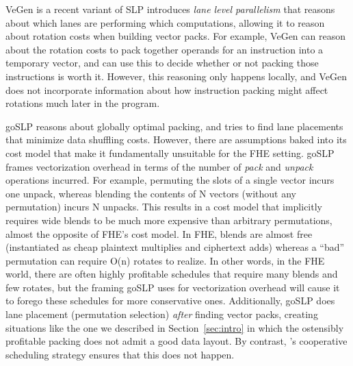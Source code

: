 VeGen \cite{VeGen} is a recent variant of SLP introduces {\em lane level parallelism} that reasons about which lanes are performing which computations, allowing it to reason about rotation costs when building vector packs.
For example, VeGen can reason about the rotation costs to pack together operands for an instruction into a temporary vector, and can use this to decide whether or not packing those instructions is worth it.
However, this reasoning only happens locally, and VeGen does not incorporate information about how instruction packing might affect rotations much later in the program.

goSLP \cite{goSLP} reasons about globally optimal packing, and tries to find lane placements that minimize data shuffling costs. 
However, there are assumptions baked into its cost model that make it fundamentally unsuitable for the FHE setting.
goSLP frames vectorization overhead in terms of the number of {\em pack} and {\em unpack} operations incurred.
For example, permuting the slots of a single vector incurs one unpack, whereas blending the contents of N vectors (without any permutation) incurs N unpacks.
This results in a cost model that implicitly requires wide blends to be much more expensive than arbitrary permutations, almost the opposite of FHE's cost model. In FHE, blends are almost free (instantiated as cheap plaintext multiplies and ciphertext adds) whereas a ``bad'' permutation can require O(n) rotates to realize.
In other words, in the FHE world, there are often highly profitable schedules that require many blends and few rotates, but the framing goSLP uses for vectorization overhead will cause it to forego these schedules for more conservative ones.
Additionally, goSLP does lane placement (permutation selection) {\em after} finding vector packs, creating situations like the one we described in Section~\ref{sec:intro} in which the ostensibly profitable packing does not admit a good data layout.
By contrast, \system's cooperative scheduling strategy ensures that this does not happen.


